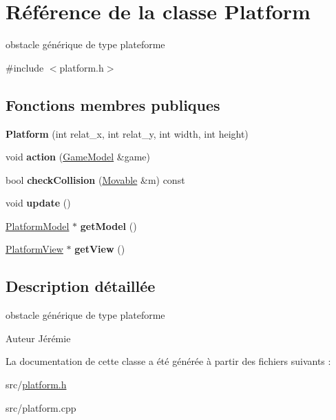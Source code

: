 \hypertarget{class_platform}{\section{Référence de la classe Platform}
\label{class_platform}
}


obstacle générique de type plateforme  




{\ttfamily \#include $<$platform.\+h$>$}

\subsection*{Fonctions membres publiques}
\begin{DoxyCompactItemize}
\item 
\hypertarget{class_platform_a1d475f45ec95f3997aec5522601df0c6}{{\bfseries Platform} (int relat\+\_\+x, int relat\+\_\+y, int width, int height)}\label{class_platform_a1d475f45ec95f3997aec5522601df0c6}

\item 
\hypertarget{class_platform_a8e6f2340fbe78e20c8e8d69268effbdf}{void {\bfseries action} (\hyperlink{class_game_model}{Game\+Model} \&game)}\label{class_platform_a8e6f2340fbe78e20c8e8d69268effbdf}

\item 
\hypertarget{class_platform_af26e0c765f394dc900fe848298144e44}{bool {\bfseries check\+Collision} (\hyperlink{class_movable}{Movable} \&m) const }\label{class_platform_af26e0c765f394dc900fe848298144e44}

\item 
\hypertarget{class_platform_aa601f00a3625669bb39252cfc932efa0}{void {\bfseries update} ()}\label{class_platform_aa601f00a3625669bb39252cfc932efa0}

\item 
\hypertarget{class_platform_aaf6ddf0c3f7599a2ff0a7a84373e31fb}{\hyperlink{class_platform_model}{Platform\+Model} $\ast$ {\bfseries get\+Model} ()}\label{class_platform_aaf6ddf0c3f7599a2ff0a7a84373e31fb}

\item 
\hypertarget{class_platform_a0b583c8796046a0c8f25302515201441}{\hyperlink{class_platform_view}{Platform\+View} $\ast$ {\bfseries get\+View} ()}\label{class_platform_a0b583c8796046a0c8f25302515201441}

\end{DoxyCompactItemize}


\subsection{Description détaillée}
obstacle générique de type plateforme 

\begin{DoxyAuthor}{Auteur}
Jérémie 
\end{DoxyAuthor}


La documentation de cette classe a été générée à partir des fichiers suivants \+:\begin{DoxyCompactItemize}
\item 
src/\hyperlink{platform_8h}{platform.\+h}\item 
src/platform.\+cpp\end{DoxyCompactItemize}
